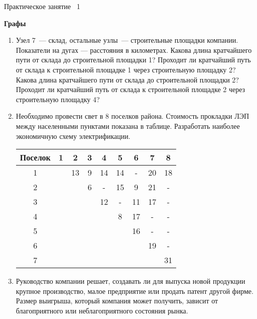 \documentclass[a4paper,12pt]{extarticle}
\begin{document}
{\centering \small Практическое занятие \textnumero~1 \par\bfseries \large Графы \par}

\begin{enumerate}
\item Узел 7~--- склад, остальные узлы~--- строительные площадки компании. 
Показатели на дугах --- расстояния в километрах. 
Какова длина кратчайшего пути от склада до строительной площадки 1? Проходит ли кратчайший путь от склада к строительной площадке 1 через строительную площадку 2? Какова длина кратчайшего пути от склада до строительной площадки 2? Проходит ли кратчайший путь от склада к строительной
площадке 2 через строительную площадку 4?

{\centering
{}
\par}

\item Необходимо провести свет в 8 поселков района. Стоимость прокладки ЛЭП между населенными пунктами показана в таблице. Разработать наиболее экономичную схему электрификации.

{\centering \begin{tabular}{|c|c|c|c|c|c|c|c|c|}
\hline
Поселок & 1 & 2 & 3 & 4 & 5  & 6  & 7 & 8\\
\hline
1 &  & 13 & 9 & 14 & 14 & -  & 20 & 18 \\
\hline
2 &  &    & 6 & -  & 15 & 9  & 21 & - \\
\hline
3 &  &    &   & 12 & -  & 11 & 17 & - \\
\hline
4 &  &    &   &    & 8  & 17 & -  & - \\
\hline
5 &  &    &   &    &    & 16 & -  & - \\
\hline
6 &  &    &   &    &    &    & 19 & - \\
\hline
7 &  &    &   &    &    &    &    & 31 \\
\hline
\end{tabular}\par}
\item 
Руководство компании решает, создавать ли для выпуска новой продукции крупное производство, малое предприятие или продать патент другой фирме. Размер выигрыша, который компания может получить, зависит от благоприятного или неблагоприятного состояния рынка.


\end{enumerate}
\end{document}
